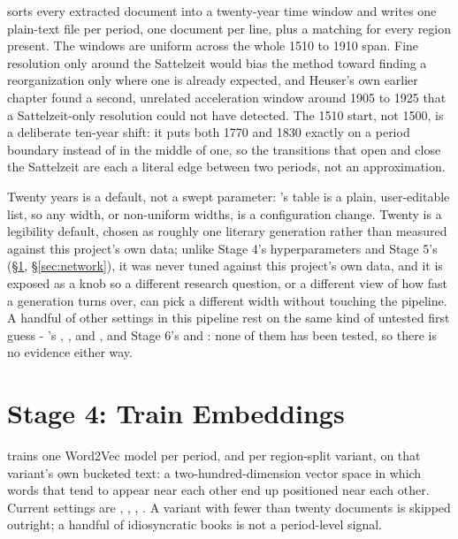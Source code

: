 \documentclass[11pt]{article}
\begin{document}
 sorts every extracted document into a
twenty-year time window and writes one plain-text file per period, one
document per line, plus a matching  for
every region present. The windows are uniform across the whole 1510 to
1910 span. Fine resolution only around the Sattelzeit would bias the
method toward finding a reorganization only where one is already
expected, and Heuser's own earlier chapter found a second, unrelated
acceleration window around 1905 to 1925 that a Sattelzeit-only
resolution could not have detected. The 1510 start, not 1500, is a
deliberate ten-year shift: it puts both 1770 and 1830 exactly on a
period boundary instead of in the middle of one, so the transitions that
open and close the Sattelzeit are each a literal edge between two
periods, not an approximation.

Twenty years is a default, not a swept parameter: 's
 table is a plain, user-editable list, so any width, or
non-uniform widths, is a configuration change. Twenty is a legibility
default, chosen as roughly one literary generation rather than measured
against this project's own data; unlike
Stage 4's hyperparameters and Stage 5's 
(\S\ref{sec:embeddings}, \S\ref{sec:network}), it was never tuned
against this project's own data, and it is exposed as a knob so a
different research question, or a different view of how fast a
generation turns over, can pick a different width without touching the
pipeline. A handful of other settings in this pipeline rest on the same
kind of untested first guess -
's ,
, and , and Stage 6's
 and : none of them has
been tested, so there is no evidence either way.

\section{Stage 4: Train Embeddings}
\label{sec:embeddings}

 trains one Word2Vec model per period, and per
region-split variant, on that variant's own bucketed text: a
two-hundred-dimension vector space in which words that tend to appear
near each other end up positioned near each other. Current settings are
, , ,
. A variant with fewer than twenty documents is skipped
outright; a handful of idiosyncratic books is not a period-level signal.
\end{document}
